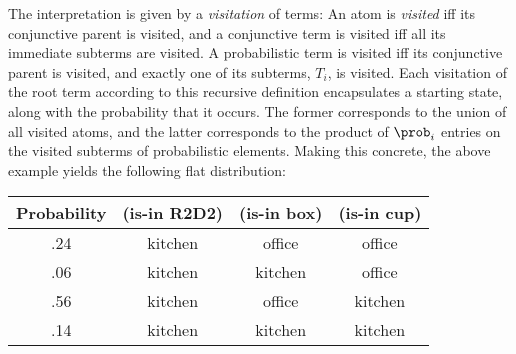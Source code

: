 \noindent The interpretation is given
by a {\em visitation} of terms: An atom is {\em visited} iff
its conjunctive parent is visited, and a conjunctive term is visited
iff all its immediate subterms are visited. A probabilistic term is
visited iff its conjunctive parent is visited, and exactly one of its
subterms, $T_i$, is visited. Each visitation of the root term
according to this recursive definition encapsulates a starting state,
along with the probability that it occurs. The former corresponds to the
union of all visited atoms, and the latter corresponds to the product
of $\prob_i$ entries on the visited subterms of probabilistic
elements. Making this concrete, the above example yields the
following flat distribution:


\small
\begin{tabular}{cccc}
\hline
Probability & (is-in R2D2)  & (is-in box)  & (is-in cup) \\
\hline
.24 & kitchen & office & office \\
.06 & kitchen & kitchen & office \\
.56 & kitchen & office & kitchen \\
.14 & kitchen & kitchen & kitchen \\
\hline
\end{tabular}
\normalsize










